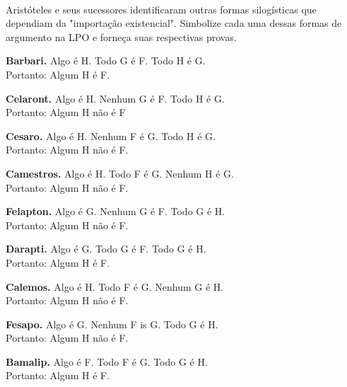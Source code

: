 \
 
\problempart
\label{pr.BarbaraEtc.proof2}
Arist\'oteles e seus sucessores identificaram outras formas silog\'isticas que dependiam da "importa\c c\~ao existencial". Simbolize cada uma dessas formas de argumento na LPO e  forne\c ca suas respectivas  provas.

\begin{earg}
	\item \textbf{Barbari.} Algo \'e H. Todo G \'e F. Todo H \'e G. \\  Portanto: Algum H \'e F.
	\item \textbf{Celaront.} Algo \'e H. Nenhum G \'e F. Todo H \'e G. \\ Portanto: Algum H n\~ao \'e F
	\item \textbf{Cesaro.} Algo \'e H. Nenhum F \'e G. Todo H \'e G. \\ Portanto: Algum H n\~ao \'e  F.
	\item \textbf{Camestros.} Algo \'e H. Todo F \'e G. Nenhum H \'e G. \\  Portanto: Algum H n\~ao \'e F.
	\item \textbf{Felapton.} Algo \'e G. Nenhum G \'e F. Todo G \'e H. \\ Portanto: Algum H n\~ao \'e F.
	\item \textbf{Darapti.} Algo \'e G. Todo G \'e F. Todo G \'e H.  \\ Portanto: Algum H \'e F.
	\item \textbf{Calemos.} Algo \'e H. Todo F \'e G. Nenhum G \'e H. \\ Portanto: Algum H n\~ao \'e F.
	\item \textbf{Fesapo.} Algo \'e G. Nenhum F is G. Todo G \'e H. \\ Portanto: Algum H n\~ao \'e F.
	\item \textbf{Bamalip.} Algo \'e F. Todo F \'e G. Todo G \'e H. \\ Portanto: Algum H \'e F.
\end{earg}

